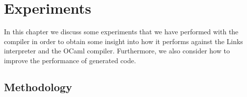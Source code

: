\documentclass[12pt,mscres,cdtppar,twoside,openright,logo,rightchapter,normalheadings]{infthesis}
\theoremstyle{definition}
\begin{document}



\chapter{Experiments}
\label{ch:experiments}

In this chapter we discuss some experiments that we have performed
with the compiler in order to obtain some insight into how it performs
against the Links interpreter and the OCaml compiler. Furthermore, we
also consider how to improve the performance of generated code.

\section{Methodology}
\label{sec:methodology}
\end{document}

